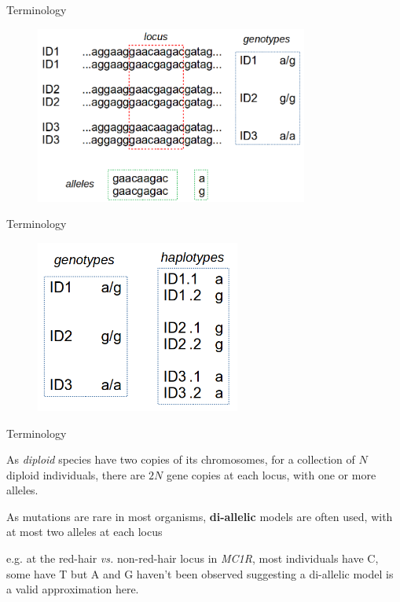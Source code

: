 \begin{frame}{Terminology}

        \begin{figure}
                \includegraphics[width=0.8\textwidth]{Pics/genotypes}
        \end{figure}

\end{frame}


\begin{frame}{Terminology}

        \begin{figure}
                \includegraphics[width=0.6\textwidth]{Pics/haplotypes}
        \end{figure}

\end{frame}


\begin{frame}{Terminology}

	\bigskip

	As \textit{diploid} species have two copies of its chromosomes, for a collection of $N$
	diploid individuals, there are $2N$ gene copies at each locus, with one or more alleles.

	\bigskip

	As mutations are rare in most organisms, \textbf{di-allelic} models are often used, with 
	at most two alleles at each locus

	\bigskip

	e.g. at the red-hair \textit{vs.} non-red-hair locus in \textit{MC1R}, most individuals have C, 
	some have T but A and G haven't been observed suggesting a di-allelic model is a valid
	approximation here.

\end{frame}


